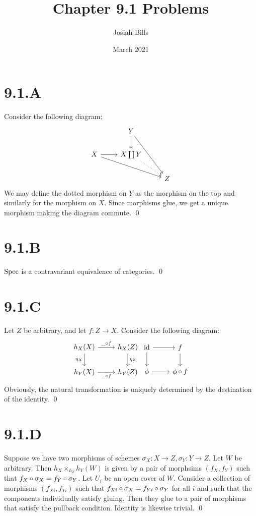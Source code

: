 \documentclass{article}
\title{Chapter 9.1 Problems}
\author{Josiah Bills}
\date{March 2021}
\begin{document}
\maketitle

\section{9.1.A}
Consider the following diagram: \[
    \begin{tikzcd}
                          & Y \ar[d] \ar[ddr]
        \\
        X \ar[r] \ar[rrd] & X \coprod Y
        \ar[dr, dotted]                           \\
                          &                   & Z
    \end{tikzcd}
\] We may define the dotted
morphism on $Y$ as the morphism on the top and similarly for
the morphism on $X$. Since morphisms glue, we get a unique
morphism making the diagram commute. \qed

\section{9.1.B}
$\operatorname{Spec}$ is a contravariant equivalence of categories. \qed

\section{9.1.C}
Let $Z$ be arbitrary, and let $f: Z \to X$. Consider
the following diagram: \[
    \begin{tikzcd}
        h_X(X) \ar[d, "\eta_X", swap] \ar[r, "\_ \after f"] & h_X(Z)
        \ar[d, "\eta_Z"]                                             \\
        h_Y(X) 	     \ar[r, "\_ \after f", swap]             & h_Y(Z)
    \end{tikzcd}
    \begin{tikzcd}
        \text{id} \ar[d] \ar[r] & f
        \ar[d]
        \\
        \phi		 \ar[r]             & \phi \after f
    \end{tikzcd}
\] Obviously, the natural
transformation is uniquely determined by the destination of the identity. \qed

\section{9.1.D}
Suppose we have two morphisms of schemes $\sigma_X: X \to Z, \sigma_Y: Y \to Z$. Let
$W$ be arbitrary. Then $h_X \times_{h_Z} h_Y(W)$ is given by a
pair of morphsims $(f_X, f_Y)$ such that $f_X \circ \sigma_X=f_Y \circ \sigma_Y$. Let
$U_i$ be an open cover of $W$. Consider a
collection of morphisms $(f_{Xi}, f_{Yi})$ such that $f_{Xi} \circ \sigma_X=f_{Yi} \circ \sigma_Y$
for all $i$ and such that the components individually
satisfy gluing. Then they glue to a pair of morphisms that satisfy the pullback
condition. Identity is likewise trivial. \qed
\end{document}
